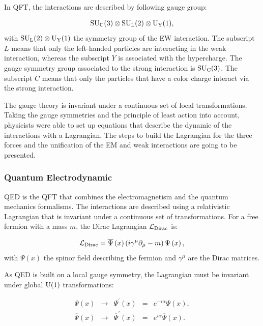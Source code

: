     In \gls{QFT}, the interactions are described by following gauge group:
    
      \begin{equation}
        \rm{SU}_{\rm{C}}(3) \otimes \rm{SU}_{\rm{L}}(2) \otimes \rm{U}_{\rm{Y}}(1),
      \end{equation}
    with $\rm{SU}_{\rm{L}}(2) \otimes \rm{U}_{\rm{Y}}(1)$ the symmetry group of the \gls{EW} interaction. 
    The subscript $L$ means that only the left-handed particles are interacting in the weak interaction, whereas the subscript $Y$ is associated with the hypercharge.
    The gauge symmetry group associated to the strong interaction is $\rm{SU}_{\rm{C}}(3)$.
    The subscript $C$ means that only the particles that have a color charge interact via the strong interaction.

    The gauge theory is invariant under a continuous set of local transformations.
    Taking the gauge symmetries and the principle of least action into account, physicists were able to set up equations that describe the dynamic of the interactions with a Lagrangian.
    The steps to build the Lagrangian for the three forces and the unification of the \gls{EM} and weak interactions are going to be presented. 

      \subsubsection{Quantum Electrodynamic}
      
      \gls{QED} is the \gls{QFT} that combines the electromagnetism and the quantum mechanics formalisms.
      The interactions are described using a relativistic Lagrangian that is invariant under a continuous set of transformations.
      For a free fermion with a mass $m$, the Dirac Lagrangian $\mathcal{L}_{\rm{Dirac}}$ is:

      \begin{equation}
        \mathcal{L}_{\rm{Dirac}} = \overline{\Psi}\left(x\right) \left(i \gamma^{\mu}\partial_{\mu} - m \right) \Psi\left(x\right),
        \label{eq:diracLag}
      \end{equation}
      with $\Psi\left(x\right)$ the spinor field describing the fermion and $\gamma^{\mu}$ are the Dirac matrices. 
      
      As \gls{QED} is built on a local gauge symmetry, the Lagrangian must be invariant under global $\rm{U}(1)$ transformations:
      
      \begin{equation}
            \begin{array}{rrccr}
             \Psi \left(x \right) & \rightarrow & \Psi^{'} \left(x \right)  & = & e^{-i\alpha} \Psi\left(x\right), \\
             \overline{\Psi}\left(x\right) & \rightarrow & \overline{\Psi}^{'}\left(x\right) & = & e^{i\alpha}  \overline{\Psi}\left(x\right). \\
            \end{array}
        \label{eq:globalTransformations}
      \end{equation}

